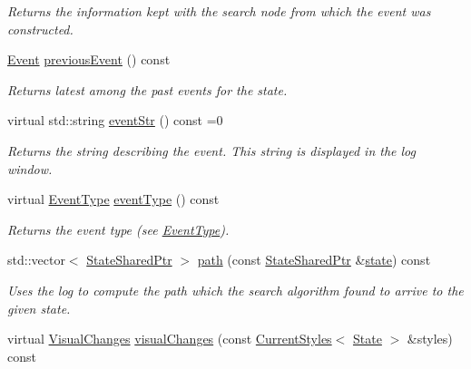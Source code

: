 \begin{DoxyCompactItemize}
\begin{DoxyCompactList}\small\item\em Returns the information kept with the search node from which the event was constructed. \end{DoxyCompactList}\item 
\hyperlink{structEventBase_a0ff1657dcfd85f6d094902d57e8f2af5}{Event} \hyperlink{structEventBase_a962f7d10db28b89b56577b241964ef87}{previous\+Event} () const 
\begin{DoxyCompactList}\small\item\em Returns latest among the past events for the state. \end{DoxyCompactList}\item 
virtual std\+::string \hyperlink{structEventBase_a39b9ccca5a07eb242fbacdcdb9ced3c6}{event\+Str} () const =0
\begin{DoxyCompactList}\small\item\em Returns the string describing the event. This string is displayed in the log window. \end{DoxyCompactList}\item 
virtual \hyperlink{event__base_8h_a2628ea8d12e8b2563c32f05dc7fff6fa}{Event\+Type} \hyperlink{structEventBase_ae96f3766933526249a42e5eebd40d51f}{event\+Type} () const 
\begin{DoxyCompactList}\small\item\em Returns the event type (see \hyperlink{event__base_8h_a2628ea8d12e8b2563c32f05dc7fff6fa}{Event\+Type}). \end{DoxyCompactList}\item 
std\+::vector$<$ \hyperlink{structEventBase_a2c0edb5cda08ce1965f3440a97b3fc87}{State\+Shared\+Ptr} $>$ \hyperlink{structEventBase_af32960577703d4ac0538d5e6d71023ee}{path} (const \hyperlink{structEventBase_a2c0edb5cda08ce1965f3440a97b3fc87}{State\+Shared\+Ptr} \&\hyperlink{structEventBase_a7e1f37b9d452d3771735f842a13204e6}{state}) const 
\begin{DoxyCompactList}\small\item\em Uses the log to compute the path which the search algorithm found to arrive to the given state. \end{DoxyCompactList}\item 
virtual \hyperlink{structEventBase_1_1VisualChanges}{Visual\+Changes} \hyperlink{structEventBase_a4ec560aec592ae86dd17e8714e9bdfc4}{visual\+Changes} (const \hyperlink{structCurrentStyles}{Current\+Styles}$<$ \hyperlink{structEventBase_a174eb2c38ec68481b21f78db338e834c}{State} $>$ \&styles) const 

\end{DoxyCompactItemize}
